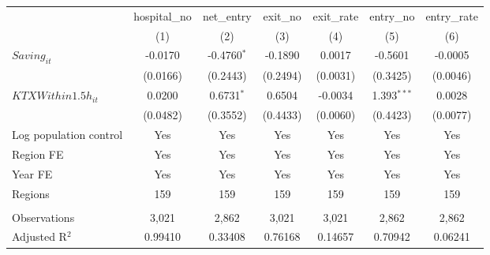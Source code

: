 \begingroup
\centering
\begin{tabular}{lcccccc}
   \toprule
                          & hospital\_no  & net\_entry    & exit\_no  & exit\_rate  & entry\_no     & entry\_rate \\    
                          & (1)           & (2)           & (3)       & (4)         & (5)           & (6)\\  
   \midrule 
   $Saving_{it}$          & -0.0170       & -0.4760$^{*}$ & -0.1890   & 0.0017      & -0.5601       & -0.0005\\   
                          & (0.0166)      & (0.2443)      & (0.2494)  & (0.0031)    & (0.3425)      & (0.0046)\\   
   $KTXWithin1.5h_{it}$   & 0.0200        & 0.6731$^{*}$  & 0.6504    & -0.0034     & 1.393$^{***}$ & 0.0028\\   
                          & (0.0482)      & (0.3552)      & (0.4433)  & (0.0060)    & (0.4423)      & (0.0077)\\   
   Log population control & Yes           & Yes           & Yes       & Yes         & Yes           & Yes\\  
   Region FE              & Yes           & Yes           & Yes       & Yes         & Yes           & Yes\\  
   Year FE                & Yes           & Yes           & Yes       & Yes         & Yes           & Yes\\  
   Regions                & 159           & 159           & 159       & 159         & 159           & 159\\  
    \\
   Observations           & 3,021         & 2,862         & 3,021     & 3,021       & 2,862         & 2,862\\  
   Adjusted R$^2$         & 0.99410       & 0.33408       & 0.76168   & 0.14657     & 0.70942       & 0.06241\\  
   \bottomrule
\end{tabular}
\par\endgroup
